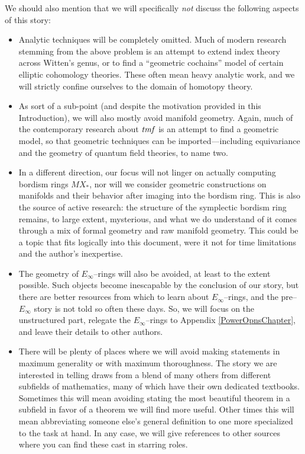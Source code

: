 We should also mention that we will specifically \emph{not} discuss the following aspects of this story:
\begin{itemize}
\item Analytic techniques will be completely omitted.  Much of modern research stemming from the above problem is an attempt to extend index theory across Witten's genus, or to find a ``geometric cochains'' model of certain elliptic cohomology theories.  These often mean heavy analytic work, and we will strictly confine ourselves to the domain of homotopy theory.
\item As sort of a sub-point (and despite the motivation provided in this Introduction), we will also mostly avoid manifold geometry.  Again, much of the contemporary research about \(\mathit{tmf}\) is an attempt to find a geometric model, so that geometric techniques can be imported---including equivariance and the geometry of quantum field theories, to name two.
\item In a different direction, our focus will not linger on actually computing bordism rings \(MX_*\), nor will we consider geometric constructions on manifolds and their behavior after imaging into the bordism ring.  This is also the source of active research: the structure of the symplectic bordism ring remains, to large extent, mysterious, and what we do understand of it comes through a mix of formal geometry and raw manifold geometry.  This could be a topic that fits logically into this document, were it not for time limitations and the author's inexpertise.
\item The geometry of \(E_\infty\)--rings will also be avoided, at least to the extent possible.  Such objects become inescapable by the conclusion of our story, but there are better resources from which to learn about \(E_\infty\)--rings, and the pre--\(E_\infty\) story is not told so often these days.  So, we will focus on the unstructured part, relegate the \(E_\infty\)--rings to Appendix \ref{PowerOpnsChapter}, and leave their details to other authors.
\item There will be plenty of places where we will avoid making statements in maximum generality or with maximum thoroughness.  The story we are interested in telling draws from a blend of many others from different subfields of mathematics, many of which have their own dedicated textbooks.  Sometimes this will mean avoiding stating the most beautiful theorem in a subfield in favor of a theorem we will find more useful.  Other times this will mean abbreviating someone else's general definition to one more specialized to the task at hand.  In any case, we will give references to other sources where you can find these cast in starring roles.
\end{itemize}

